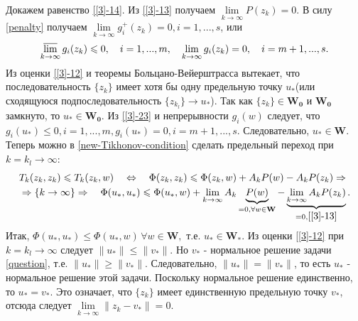 Докажем равенство \eqref{[3]-14}. Из \eqref{[3]-13} получаем $\lim\limits_{k\rightarrow\infty}P(z_k)=0$. В силу \eqref{penalty} получаем $\lim\limits_{k\rightarrow\infty}g_i^+(z_k)=0,i=1,...,s$, или 
\begin{equation}\label{[3]-23}
\varlimsup_{k\rightarrow \infty}g_i(z_k)\leqslant 0,\quad i=1,...,m,\quad \lim_{k\rightarrow\infty}g_i(z_k)=0,\quad i=m+1,...,s.
\end{equation}
Из оценки \eqref{[3]-12} и теоремы Больцано-Вейерштрасса вытекает, что последовательность $\{z_k\}$ имеет хотя бы одну предельную точку $u_*$(или сходящуюся подпоследовательность $\{z_{k_l}\}\rightarrow u_*$). Так как $\{z_k\}\in\mathbf{W_0}$ и $\mathbf{W_0}$ замкнуто, то $u_*\in\mathbf{W_0}$. Из \eqref{[3]-23} и непрерывности $g_i(w)$ следует, что $g_i(u_*)\leqslant 0,i=1,...,m,g_i(u_*)=0,i=m+1,...,s$. Следовательно, $u_*\in\mathbf{W}$. Теперь можно в \eqref{new-Tikhonov-condition} сделать предельный переход при $k=k_l\rightarrow\infty$:
\begin{equation}
\begin{aligned}
&T_k(z_k,z_k)\leqslant T_k(z_k,w)\quad\Leftrightarrow\quad\Phi(z_k,z_k)\leqslant\Phi(z_k,w)+A_kP(w)-A_kP(z_k)\Rightarrow\\
&\Rightarrow\{k\rightarrow\infty\}\Rightarrow\quad \Phi(u_*,u_*)\leqslant\Phi(u_*,w)+\lim\limits_{k\rightarrow\infty}A_k\underbrace{P(w)}_{=0,\forall w\in \mathbf{W}}-\underbrace{\lim\limits_{k\rightarrow\infty}A_kP(z_k)}_{=0,\eqref{[3]-13}}.
\end{aligned}
\end{equation}
Итак, $\Phi(u_*,u_*)\leqslant\Phi(u_*,w)\,\forall w\in\mathbf{W},$ т.е. $u_*\in\mathbf{W_*}$. Из оценки \eqref{[3]-12} при $k=k_l\rightarrow\infty$ следует $\|u_*\|\leqslant\|v_*\|$. Но $v_*$ - нормальное решение задачи \eqref{question}, т.е. $\|u_*\|\geqslant\|v_*\|$. Следовательно, $\|u_*\|=\|v_*\|$, то есть $u_*$ - нормальное решение этой задачи. Поскольку нормальное решение единственно, то $u_*=v_*$. Это означает, что $\{z_k\}$ имеет единственную предельную точку $v_*$, отсюда следует $\lim\limits_{k\rightarrow\infty}\|z_k-v_*\|=0$.

